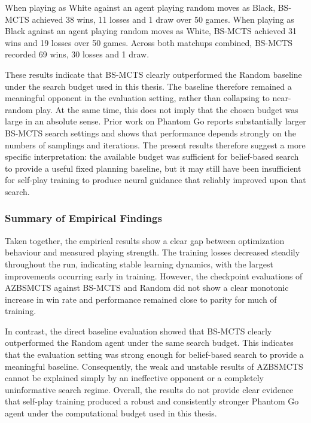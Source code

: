 \documentclass[12pt,oneside,openright]{article}
\begin{document}
When playing as White against an agent playing random moves as Black, BS-MCTS achieved 38 wins, 11 losses and 1 draw over 50 games. When playing as Black against an agent playing random moves as White, BS-MCTS achieved 31 wins and 19 losses over 50 games. Across both matchups combined, BS-MCTS recorded 69 wins, 30 losses and 1 draw.

These results indicate that BS-MCTS clearly outperformed the Random baseline under the search budget used in this thesis. The baseline therefore remained a meaningful opponent in the evaluation setting, rather than collapsing to near-random play. At the same time, this does not imply that the chosen budget was large in an absolute sense. Prior work on Phantom Go reports substantially larger BS-MCTS search settings and shows that performance depends strongly on the numbers of samplings and iterations. The present results therefore suggest a more specific interpretation: the available budget was sufficient for belief-based search to provide a useful fixed planning baseline, but it may still have been insufficient for self-play training to produce neural guidance that reliably improved upon that search.


\subsubsection{Summary of Empirical Findings}

Taken together, the empirical results show a clear gap between optimization behaviour and measured playing strength. The training losses decreased steadily throughout the run, indicating stable learning dynamics, with the largest improvements occurring early in training. However, the checkpoint evaluations of AZBSMCTS against BS-MCTS and Random did not show a clear monotonic increase in win rate and performance remained close to parity for much of training.

In contrast, the direct baseline evaluation showed that BS-MCTS clearly outperformed the Random agent under the same search budget. This indicates that the evaluation setting was strong enough for belief-based search to provide a meaningful baseline. Consequently, the weak and unstable results of AZBSMCTS cannot be explained simply by an ineffective opponent or a completely uninformative search regime. Overall, the results do not provide clear evidence that self-play training produced a robust and consistently stronger Phantom Go agent under the computational budget used in this thesis.
\end{document}
